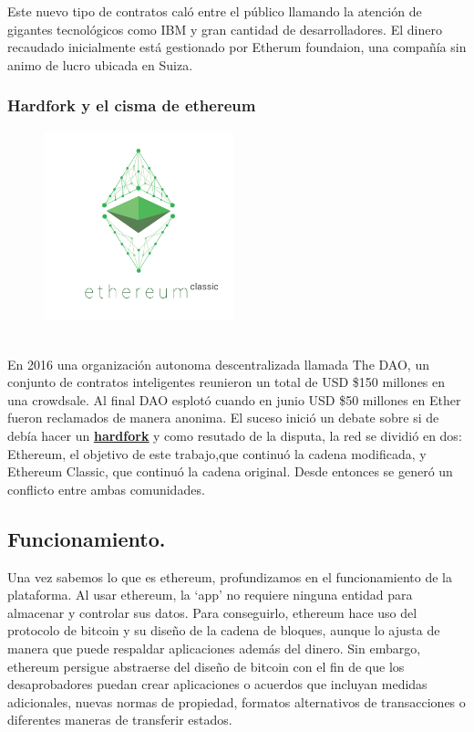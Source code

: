 \documentclass[11pt,a4paper]{article}
\begin{document}
Este nuevo tipo de contratos caló entre el público llamando la atención de gigantes tecnológicos como IBM y gran cantidad de desarrolladores. El dinero recaudado inicialmente está gestionado por Etherum foundaion\footnotemark, una compañía sin animo de lucro ubicada en Suiza.	\\


\subsubsection{Hardfork y el cisma de ethereum}
\begin{figure}
\caption{\ \ }
\includegraphics[width=5.5cm]{images/classic1.png}
\end{figure} 
En 2016 una organización autonoma descentralizada llamada The DAO, un conjunto de contratos inteligentes reunieron un total de USD \$150 millones en una crowdsale. Al final DAO esplotó cuando en junio USD \$50 millones en Ether fueron reclamados de manera anonima. El suceso inició un debate sobre si de debía hacer un 
\hyperref[sec:hardfork]{\textbf{\underline{hardfork}}} y como resutado de la disputa, la red se dividió en dos: Ethereum, el objetivo de este trabajo,que continuó la cadena modificada, y Ethereum Classic, que continuó la cadena original. Desde entonces se generó un conflicto entre ambas comunidades.\\


\subsection{Funcionamiento.\\} 
Una vez sabemos lo que es ethereum, profundizamos en el funcionamiento de la plataforma.
Al usar ethereum, la ‘app’ no requiere ninguna entidad para almacenar y controlar sus datos. Para conseguirlo, ethereum hace uso del protocolo de bitcoin y su diseño de la cadena de bloques, aunque lo ajusta de manera que puede respaldar aplicaciones además del dinero. Sin embargo, ethereum persigue abstraerse del diseño de bitcoin con el fin de que los desaprobadores puedan crear aplicaciones o acuerdos que incluyan medidas adicionales, nuevas normas de propiedad, formatos alternativos de transacciones o diferentes maneras de transferir estados.\\
\end{document}
